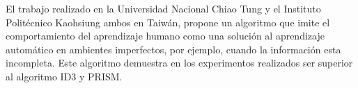 El trabajo realizado en la Universidad Nacional Chiao Tung y el Instituto
 Polit\'ecnico Kaohsiung ambos en Taiw\'an\cite{Chang1996}, propone un algoritmo
 que imite el comportamiento del aprendizaje humano como una soluci\'on al
 aprendizaje autom\'atico en ambientes imperfectos, por ejemplo, cuando la
 informaci\'on esta incompleta. Este algoritmo demuestra en los experimentos
 realizados ser superior al algoritmo ID3 y PRISM.